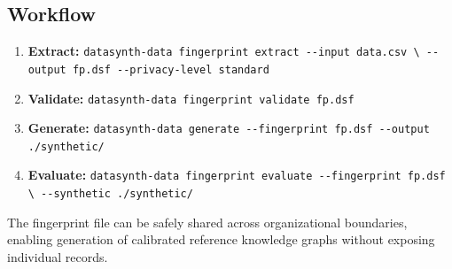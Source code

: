 \subsection{Workflow}
\label{sec:priv_workflow}

\smallskip\noindent
{\small
\begin{enumerate}
  \item \textbf{Extract:}
    \texttt{datasynth-data fingerprint extract -{}-input data.csv \textbackslash\newline
    \hspace*{2em} -{}-output fp.dsf -{}-privacy-level standard}
  \item \textbf{Validate:}
    \texttt{datasynth-data fingerprint validate fp.dsf}
  \item \textbf{Generate:}
    \texttt{datasynth-data generate -{}-fingerprint fp.dsf -{}-output ./synthetic/}
  \item \textbf{Evaluate:}
    \texttt{datasynth-data fingerprint evaluate -{}-fingerprint fp.dsf \textbackslash\newline
    \hspace*{2em} -{}-synthetic ./synthetic/}
\end{enumerate}
}

The fingerprint file can be safely shared across organizational
boundaries, enabling generation of calibrated reference knowledge
graphs without exposing individual records.
